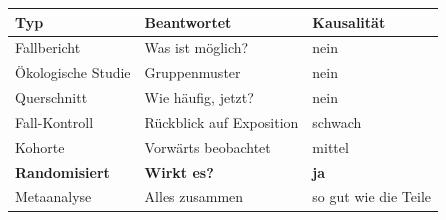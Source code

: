 \begin{merksatz}
\begin{center}
{\small
\renewcommand{\arraystretch}{1.5}
\begin{tabular}{@{}P{2.8cm}P{3.0cm}P{2.4cm}@{}}
\toprule
\textbf{Typ} & \textbf{Beantwortet} & \textbf{Kausalität}\\
\midrule
Fallbericht & Was ist möglich? & \textcolor{akzent}{nein}\\
Ökologische Studie & Gruppenmuster & \textcolor{akzent}{nein}\\
Querschnitt & Wie häufig, jetzt? & \textcolor{akzent}{nein}\\
Fall-Kontroll & Rückblick auf Exposition & \textcolor{mittel}{schwach}\\
Kohorte & Vorwärts beobachtet & \textcolor{mittel}{mittel}\\
\textbf{Randomisiert} & \textbf{Wirkt es?} & \textcolor{gruen}{\textbf{ja}}\\
Metaanalyse & Alles zusammen & \textcolor{gruen}{so gut wie die Teile}\\
\bottomrule
\end{tabular}}
\end{center}

\begin{center}
\begin{minipage}{0.88\textwidth}
\end{minipage}
\end{center}
\end{merksatz}

